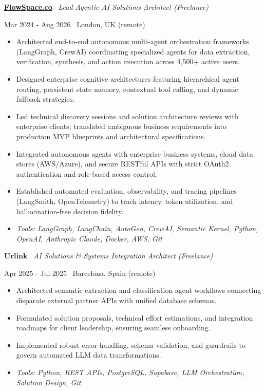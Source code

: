\documentclass[a4paper,10pt]{article}
\newcommand{\role}[4]{%
  \vspace{2pt}\noindent
  \begin{minipage}[t]{0.70\textwidth}\raggedright\textbf{#1} \textbullet\ \textit{#3}\end{minipage}%
  \hfill
  \begin{minipage}[t]{0.28\textwidth}\raggedleft\footnotesize\color{gray}#2 \textbullet\ #4\end{minipage}%
  \vspace{1pt}%
}
\begin{document}
\role{\href{https://flowspace.co}{FlowSpace.co}}{Mar 2024 - Aug 2026}{Lead Agentic AI Solutions Architect (Freelance)}{London, UK (remote)}
\begin{itemize}
  \item Architected end-to-end autonomous multi-agent orchestration frameworks (LangGraph, CrewAI) coordinating specialized agents for data extraction, verification, synthesis, and action execution across 4,500+ active users.
  \item Designed enterprise cognitive architectures featuring hierarchical agent routing, persistent state memory, contextual tool calling, and dynamic fallback strategies.
  \item Led technical discovery sessions and solution architecture reviews with enterprise clients; translated ambiguous business requirements into production MVP blueprints and architectural specifications.
  \item Integrated autonomous agents with enterprise business systems, cloud data stores (AWS/Azure), and secure RESTful APIs with strict OAuth2 authentication and role-based access control.
  \item Established automated evaluation, observability, and tracing pipelines (LangSmith, OpenTelemetry) to track latency, token utilization, and hallucination-free decision fidelity.
  \item \textit{Tools: LangGraph, LangChain, AutoGen, CrewAI, Semantic Kernel, Python, OpenAI, Anthropic Claude, Docker, AWS, Git}
\end{itemize}

\role{Urlink}{Apr 2025 - Jul 2025}{AI Solutions \& Systems Integration Architect (Freelance)}{Barcelona, Spain (remote)}
\begin{itemize}
  \item Architected semantic extraction and classification agent workflows connecting disparate external partner APIs with unified database schemas.
  \item Formulated solution proposals, technical effort estimations, and integration roadmaps for client leadership, ensuring seamless onboarding.
  \item Implemented robust error-handling, schema validation, and guardrails to govern automated LLM data transformations.
  \item \textit{Tools: Python, REST APIs, PostgreSQL, Supabase, LLM Orchestration, Solution Design, Git}
\end{itemize}
\end{document}
